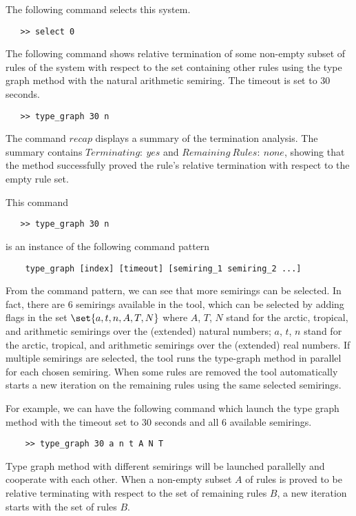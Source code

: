 The following command selects this system.
 \begin{verbatim}
   >> select 0
\end{verbatim}
The following command shows relative termination of some non-empty subset of rules of the system with respect to the set containing other rules using the type graph method with the natural arithmetic semiring. The timeout is set to 30 seconds.
 \begin{verbatim}
   >> type_graph 30 n
\end{verbatim}
The command \colorbox{Ivory2}{$recap$} displays a summary of the termination analysis. The summary contains \colorbox{Ivory2}{$Terminating:\ yes$} and \colorbox{Ivory2}{$Remaining\ Rules:\ none$}, showing that the method successfully proved the rule's relative termination with respect to the empty rule set.

This command
\begin{verbatim}
   >> type_graph 30 n
\end{verbatim}
is an instance of the following command pattern
\begin{verbatim}
    type_graph [index] [timeout] [semiring_1 semiring_2 ...]
\end{verbatim}
From the command pattern, we can see that more semirings can be selected. In fact, there are 6 semirings available in the tool, which can be selected by adding flags in the set $\set{a,t,n,A,T,N}$ where $A$, $T$, $N$ stand for the arctic, tropical, and arithmetic semirings over the (extended) natural numbers;  $a$, $t$, $n$ stand for the arctic, tropical, and arithmetic semirings over the (extended) real numbers. If multiple semirings are selected, the tool runs the type-graph method in parallel for each chosen semiring. When some rules are removed the tool automatically starts a new iteration on the remaining rules using the same selected semirings. 

For example, we can have the following command which launch the type graph method with the timeout set to 30 seconds and all 6 available semirings.
\begin{verbatim} 
    >> type_graph 30 a n t A N T
\end{verbatim}
Type graph method with different semirings will be launched parallelly and cooperate with each other. When a non-empty subset $A$ of rules is proved to be relative terminating with respect to the set of remaining rules $B$, a new iteration starts with the set of rules $B$.



